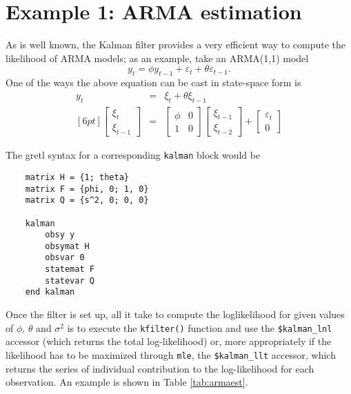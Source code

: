\documentclass[a4paper]{article}
\begin{document}
\section{Example 1: ARMA estimation}
\label{sec:example_arma}

As is well known, the Kalman filter provides a very efficient way to
compute the likelihood of ARMA models; as an example, take an
ARMA(1,1) model
\[
  y_t = \phi y_{t-1} + \varepsilon_t + \theta \varepsilon_{t-1} .
\]
One of the ways the above equation can be cast in state-space form is
\begin{eqnarray*}
  y_t & = & \xi_t + \theta \xi_{t-1} \\ [6pt]
  \left[ \begin{array}{c} \xi_t \\ \xi_{t-1} \end{array} \right] & = &
  \left[ \begin{array}{cc} \phi & 0 \\ 1 & 0 \end{array} \right]
  \left[ \begin{array}{c} \xi_{t-1} \\ \xi_{t-2} \end{array} \right] +
  \left[ \begin{array}{c} \varepsilon_t \\ 0 \end{array} \right] 
\end{eqnarray*}

The gretl syntax for a corresponding \texttt{kalman} block would be
\begin{verbatim}
    matrix H = {1; theta}
    matrix F = {phi, 0; 1, 0}
    matrix Q = {s^2, 0; 0, 0}

    kalman
        obsy y
        obsymat H
        obsvar 0
        statemat F
        statevar Q
    end kalman
\end{verbatim}

Once the filter is set up, all it take to compute the loglikelihood
for given values of $\phi$, $\theta$ and $\sigma^2$ is to execute the
\texttt{kfilter()} function and use the \verb+$kalman_lnl+ accessor
(which returns the total log-likelihood) or, more appropriately if the
likelihood has to be maximized through \texttt{mle}, the
\verb+$kalman_llt+ accessor, which returns the series of individual
contribution to the log-likelihood for each observation. An example
is shown in Table \ref{tab:armaest}.
\end{document}
